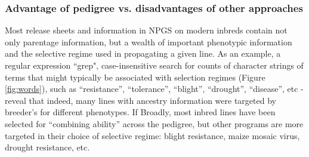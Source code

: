 \documentclass[12pt]{article}
\begin{document}
\subsubsection*{Advantage of pedigree vs. disadvantages of other approaches}
Most release sheets and information in NPGS on modern inbreds contain not only parentage information, but a wealth of important phenotypic information and the selective regime used in propagating a given line. 
As an example, a regular expression ``grep", case-insensitive search for counts of character strings of terms that might typically be associated with selection regimes  (Figure \ref{fig:words}), such as ``resistance'', ``tolerance'', ``blight'', ``drought'', ``disease'', etc - reveal that indeed, many lines with ancestry information were targeted by breeder's for different phenotypes. 
If 
Broadly, most inbred lines have been selected for ``combining ability'' across the pedigree, but other programs are more targeted in their choice of selective regime: blight resistance, maize mosaic virus, drought resistance, etc. 
\end{document}
